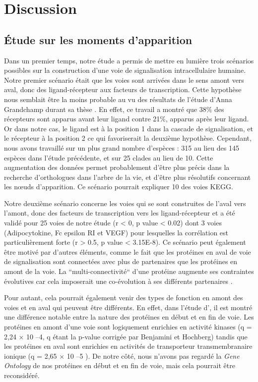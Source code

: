 \chapter{Discussion}
\thispagestyle{firstpage}
\onehalfspacing

\section{Étude sur les moments d’apparition}
\par Dans un premier temps, notre étude a permis de mettre en lumière trois scénarios possibles sur la construction d’une voie de signalisation intracellulaire humaine. Notre premier scénario était que les voies sont arrivées dans le sens amont vers aval, donc des ligand-récepteur aux facteurs de transcription. Cette hypothèse nous semblait être la moins probable au vu des résultats de l’étude d’Anna Grandchamp durant sa thèse \parencite{Grandchamp & Monget, 2018}. En effet, ce travail a montré que 38\% des récepteurs sont apparus avant leur ligand contre 21\%, apparus après leur ligand. Or dans notre cas, le ligand est à la position 1 dans la cascade de signalisation, et le récepteur à la position 2 ce qui favoriserait la deuxième hypothèse. Cependant, nous avons travaillé sur un plus grand nombre d’espèces : 315 au lieu des 145 espèces dans l’étude précédente, et sur 25 clades au lieu de 10. Cette augmentation des données permet probablement d’être plus précis dans la recherche d’orthologues dans l’arbre de la vie, et d’être plus résolutifs concernant les nœuds d’apparition. Ce scénario pourrait expliquer 10 des voies KEGG. 
\par Notre deuxième scénario concerne les voies qui se sont construites de l’aval vers l’amont, donc des facteurs de transcription vers les ligand-récepteur et a été validé pour 25 voies de notre étude (r < 0, p value < 0.02) dont 3 voies (Adipocytokine, Fc epsilon RI et VEGF) pour lesquelles la corrélation est particulièrement forte (r > 0.5, p value < 3.15E-8). Ce scénario peut également être motivé par d’autres éléments, comme le fait que les protéines en aval de voie de signalisation sont connectées avec plus de partenaires que les protéines en amont de la voie. La “multi-connectivité“ d’une protéine augmente ses contraintes évolutives car cela imposerait une co-évolution à ses différents partenaires \parencite{fraser_evolutionary_2002, hahn_molecular_2004, krylov_gene_2003}. 
\par Pour autant, cela pourrait également venir des types de fonction en amont des voies et en aval qui peuvent être différents. En effet, dans l’étude d’\cite{alvarez-ponce_relationship_2012}, il est montré une différence notable entre la nature des protéines en début et en fin de voie. Les protéines en amont d’une voie sont logiquement enrichies en activité kinases (q = 2,24 × 10 –4, q étant la p-value corrigée par Benjamini et Hochberg) tandis que les protéines en aval sont enrichies en activités de transporteur transmembranaire ionique (q = 2,65 × 10 –5 ). De notre côté, nous n’avons pas regardé la \textit{Gene Ontology} de nos protéines en début et en fin de voie, mais cela pourrait être reconsidéré.
